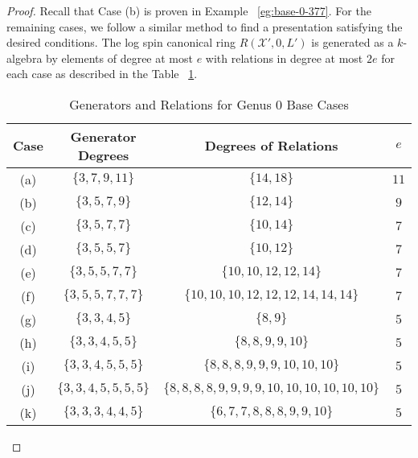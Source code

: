 \documentclass{amsart}
\theoremstyle{plain}
\theoremstyle{definition}
\theoremstyle{remark}
\numberwithin{equation}{section}
\newcommand\sx{\mathscr X}
\begin{document}
\begin{proof}
Recall that Case (b) is proven in Example ~\ref{eg:base-0-377}. For
the remaining cases, we follow a similar method to find a
presentation satisfying the desired conditions. The log spin
canonical ring $R(\sx', 0, L')$ is generated as a $k$-algebra by
elements of degree at most $e$ with relations in degree at most $2e$
for each case as described in the Table ~\ref{table:g-0-base-cases-degrees}.
\begin{table}
\begin{tabular}
	{| c || c | c | c |}
	\hline
	Case & Generator Degrees & Degrees of Relations & $e$\\
	\hline
	\hline

	(a) & $\{3, 7, 9, 11\}$ & $\{14, 18\}$ & $11$ \\	\hline

	(b) & $\{3, 5, 7, 9\}$ & $\{12, 14\}$ & $9$ \\ \hline

	(c) & $\{3, 5, 7, 7\}$ & $\{10, 14\}$ & $7$ \\ \hline
	
	(d) & $\{3, 5, 5, 7\}$ & $\{10, 12\}$	& $7$ \\ \hline
	
	(e) & $\{3, 5, 5, 7, 7\}$ & $\{10, 10, 12, 12, 14\}$	& $7$ \\ \hline
	
	(f) & $\{3, 5, 5, 7, 7, 7\}$ & $\{10, 10, 10, 12, 12, 12, 14, 14, 14\}$	& $7$ \\ \hline

	(g) & $\{3, 3, 4, 5\}$ & $\{8, 9\}$ & $5$ \\ \hline
	
	(h) & $\{3, 3, 4, 5, 5\}$ & $\{8, 8, 9, 9, 10\}$ & $5$ \\ \hline
	
	(i) & $\{3, 3, 4, 5, 5, 5\}$ &
	$\{8, 8, 8, 9, 9, 9, 10, 10, 10\}$ & $5$ \\ \hline
	
	(j) & $\{3, 3, 4, 5, 5, 5, 5\}$ &
	$\{8, 8, 8, 8, 9, 9, 9, 9, 10, 10, 10, 10, 10, 10\}$ & $5$ \\ \hline

	(k) &	$\{3, 3, 3, 4, 4, 5\}$ & $\{6, 7, 7, 8, 8, 8, 9, 9, 10\}$ & $5$ \\ \hline
	\end{tabular}
	\caption{Generators and Relations for Genus 0 Base Cases}
	\label{table:g-0-base-cases-degrees}
\end{table}


\end{proof}
\end{document}
